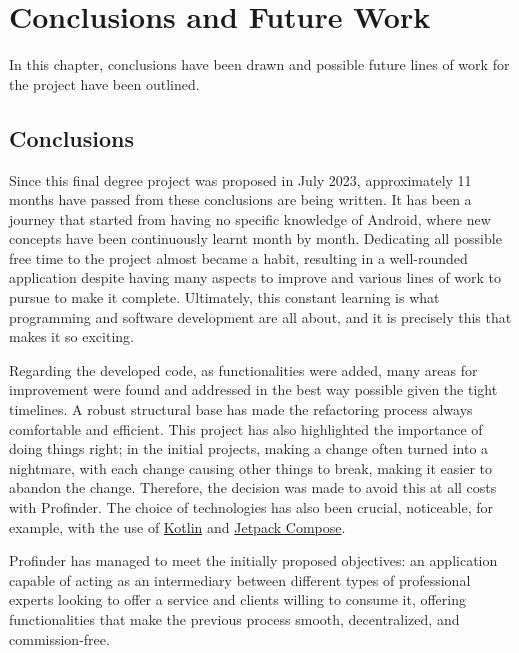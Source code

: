 \chapter*{Conclusions and Future Work}
\label{cap:conclusions}
In this chapter, conclusions have been drawn and possible future lines of work for the project have been outlined.

\section*{Conclusions}
Since this final degree project was proposed in July 2023, approximately 11 months have passed from these conclusions are being written. It has been a journey that started from having no specific knowledge of Android, where new concepts have been continuously learnt month by month. Dedicating all possible free time to the project almost became a habit, resulting in a well-rounded application despite having many aspects to improve and various lines of work to pursue to make it complete. Ultimately, this constant learning is what programming and software development are all about, and it is precisely this that makes it so exciting.

Regarding the developed code, as functionalities were added, many areas for improvement were found and addressed in the best way possible given the tight timelines. A robust structural base has made the refactoring process always comfortable and efficient. This project has also highlighted the importance of doing things right; in the initial projects, making a change often turned into a nightmare, with each change causing other things to break, making it easier to abandon the change. Therefore, the decision was made to avoid this at all costs with Profinder. The choice of technologies has also been crucial, noticeable, for example, with the use of \hyperlink{subsec:kotlin}{Kotlin} and \hyperlink{subsec:compose}{Jetpack Compose}.

Profinder has managed to meet the initially proposed objectives: an application capable of acting as an intermediary between different types of professional experts looking to offer a service and clients willing to consume it, offering functionalities that make the previous process smooth, decentralized, and commission-free.

